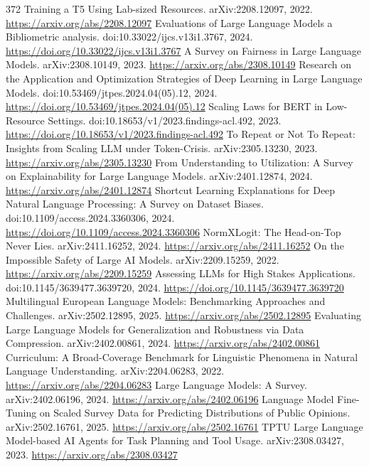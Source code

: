 \documentclass[11pt]{article}
\begin{document}
\begin{thebibliography}{372}
 Training a T5 Using Lab-sized Resources. arXiv:2208.12097, 2022. \url{https://arxiv.org/abs/2208.12097}
 Evaluations of Large Language Models a Bibliometric analysis. doi:10.33022/ijcs.v13i1.3767, 2024. \url{https://doi.org/10.33022/ijcs.v13i1.3767}
 A Survey on Fairness in Large Language Models. arXiv:2308.10149, 2023. \url{https://arxiv.org/abs/2308.10149}
 Research on the Application and Optimization Strategies of Deep Learning in Large Language Models. doi:10.53469/jtpes.2024.04(05).12, 2024. \url{https://doi.org/10.53469/jtpes.2024.04(05).12}
 Scaling Laws for BERT in Low-Resource Settings. doi:10.18653/v1/2023.findings-acl.492, 2023. \url{https://doi.org/10.18653/v1/2023.findings-acl.492}
 To Repeat or Not To Repeat: Insights from Scaling LLM under Token-Crisis. arXiv:2305.13230, 2023. \url{https://arxiv.org/abs/2305.13230}
 From Understanding to Utilization: A Survey on Explainability for Large Language Models. arXiv:2401.12874, 2024. \url{https://arxiv.org/abs/2401.12874}
 Shortcut Learning Explanations for Deep Natural Language Processing: A Survey on Dataset Biases. doi:10.1109/access.2024.3360306, 2024. \url{https://doi.org/10.1109/access.2024.3360306}
 NormXLogit: The Head-on-Top Never Lies. arXiv:2411.16252, 2024. \url{https://arxiv.org/abs/2411.16252}
 On the Impossible Safety of Large AI Models. arXiv:2209.15259, 2022. \url{https://arxiv.org/abs/2209.15259}
 Assessing LLMs for High Stakes Applications. doi:10.1145/3639477.3639720, 2024. \url{https://doi.org/10.1145/3639477.3639720}
 Multilingual European Language Models: Benchmarking Approaches and Challenges. arXiv:2502.12895, 2025. \url{https://arxiv.org/abs/2502.12895}
 Evaluating Large Language Models for Generalization and Robustness via Data Compression. arXiv:2402.00861, 2024. \url{https://arxiv.org/abs/2402.00861}
 Curriculum: A Broad-Coverage Benchmark for Linguistic Phenomena in Natural Language Understanding. arXiv:2204.06283, 2022. \url{https://arxiv.org/abs/2204.06283}
 Large Language Models: A Survey. arXiv:2402.06196, 2024. \url{https://arxiv.org/abs/2402.06196}
 Language Model Fine-Tuning on Scaled Survey Data for Predicting Distributions of Public Opinions. arXiv:2502.16761, 2025. \url{https://arxiv.org/abs/2502.16761}
 TPTU Large Language Model-based AI Agents for Task Planning and Tool Usage. arXiv:2308.03427, 2023. \url{https://arxiv.org/abs/2308.03427}

\end{thebibliography}
\end{document}

